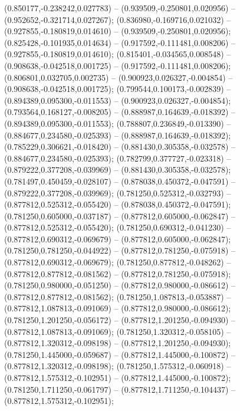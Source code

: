  (0.850177,-0.238242,0.027783) -- (0.939509,-0.250801,0.020956) -- (0.952652,-0.321714,0.027267);
 (0.836980,-0.169716,0.021032) -- (0.927855,-0.180819,0.014610) -- (0.939509,-0.250801,0.020956);
 (0.825428,-0.101935,0.014634) -- (0.917592,-0.111481,0.008206) -- (0.927855,-0.180819,0.014610);
 (0.815401,-0.034565,0.008548) -- (0.908638,-0.042518,0.001725) -- (0.917592,-0.111481,0.008206);
 (0.806801,0.032705,0.002735) -- (0.900923,0.026327,-0.004854) -- (0.908638,-0.042518,0.001725);
 (0.799544,0.100173,-0.002839) -- (0.894389,0.095300,-0.011553) -- (0.900923,0.026327,-0.004854);
 (0.793564,0.168127,-0.008205) -- (0.888987,0.164639,-0.018392) -- (0.894389,0.095300,-0.011553);
 (0.788807,0.236849,-0.013390) -- (0.884677,0.234580,-0.025393) -- (0.888987,0.164639,-0.018392);
 (0.785229,0.306621,-0.018420) -- (0.881430,0.305358,-0.032578) -- (0.884677,0.234580,-0.025393);
 (0.782799,0.377727,-0.023318) -- (0.879222,0.377208,-0.039969) -- (0.881430,0.305358,-0.032578);
 (0.781497,0.450459,-0.028107) -- (0.878038,0.450372,-0.047591) -- (0.879222,0.377208,-0.039969);
 (0.781250,0.525312,-0.032793) -- (0.877812,0.525312,-0.055420) -- (0.878038,0.450372,-0.047591);
 (0.781250,0.605000,-0.037187) -- (0.877812,0.605000,-0.062847) -- (0.877812,0.525312,-0.055420);
 (0.781250,0.690312,-0.041230) -- (0.877812,0.690312,-0.069679) -- (0.877812,0.605000,-0.062847);
 (0.781250,0.781250,-0.044922) -- (0.877812,0.781250,-0.075918) -- (0.877812,0.690312,-0.069679);
 (0.781250,0.877812,-0.048262) -- (0.877812,0.877812,-0.081562) -- (0.877812,0.781250,-0.075918);
 (0.781250,0.980000,-0.051250) -- (0.877812,0.980000,-0.086612) -- (0.877812,0.877812,-0.081562);
 (0.781250,1.087813,-0.053887) -- (0.877812,1.087813,-0.091069) -- (0.877812,0.980000,-0.086612);
 (0.781250,1.201250,-0.056172) -- (0.877812,1.201250,-0.094930) -- (0.877812,1.087813,-0.091069);
 (0.781250,1.320312,-0.058105) -- (0.877812,1.320312,-0.098198) -- (0.877812,1.201250,-0.094930);
 (0.781250,1.445000,-0.059687) -- (0.877812,1.445000,-0.100872) -- (0.877812,1.320312,-0.098198);
 (0.781250,1.575312,-0.060918) -- (0.877812,1.575312,-0.102951) -- (0.877812,1.445000,-0.100872);
 (0.781250,1.711250,-0.061797) -- (0.877812,1.711250,-0.104437) -- (0.877812,1.575312,-0.102951);
